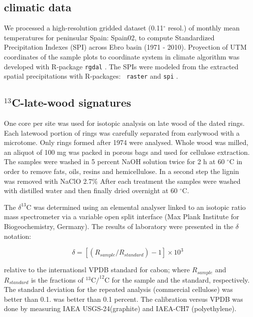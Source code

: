 \documentclass[review,authoryear]{elsarticle}
\begin{document}
\subsection{climatic data}
We processed a high-resolution gridded dataset (0.11$^{\circ}$ resol.)
of monthly mean temperatures for peninsular Spain: Spain02,
\citep{Herrera2015} to compute Standardized Precipitation Indexes
(SPI) across Ebro basin (1971 - 2010). Proyection of UTM coordinates
of the sample plots to coordinate system in climate algorithm was
developed with R-package {\tt rgdal} \citep{Bivand2015}. The SPIs were
modeled from the extracted spatial precipitations with R-packages: {\tt
  raster}\citep{Hijmans2015} and {\tt spi} \citep{Neves2012}.

\subsection{$^{13}$C-late-wood signatures}
One core per site was used for isotopic analysis on late wood of the
dated rings. Each latewood portion of rings was carefully separated
from earlywood with a microtome. Only rings formed after 1974 were
analysed. Whole wood was milled, an aliquot of 100 mg was packed in
porous bags and used for cellulose extraction. The samples were washed
in 5 percent NaOH solution twice for 2 h at 60 $^{\circ}$C in order to
remove fats, oils, resins and hemicellulose. In a second step the
lignin was removed with NaClO 2.7\% After each treatment the samples
were washed with distilled water and then finally dried overnight at
60 $^{\circ}$C.

The $\delta^{13}$C was determined using an elemental analyser linked
to an isotopic ratio mass spectrometer via a variable open split
interface (Max Plank Institute for Biogeochemistry, Germany). The
results of laboratory were presented in the $\delta$ notation:

\begin{equation}\label{eq:dC}
\delta = \left [ \left ( R_{sample}/R_{standard} \right )-1 \right ]\times 10^3 
\end{equation}


relative to the internationsl VPDB standard for cabon; where
$R_{sample}$ and $R_{standard}$ is the fractions of $^{13}$C$/^{12}$C
for the sample and the standard, respectively. The standard deviation
for the repeated analysis (commercial cellulose) was better than
0.1. was better than 0.1 percent. The calibration versus VPDB was done
by measuring IAEA USGS-24(graphite) and IAEA-CH7 (polyethylene).
\end{document}
